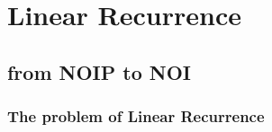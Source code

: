 \documentclass{beamer}
\begin{document}
\section{Linear Recurrence}
\subsection{from NOIP to NOI}

\begin{frame}
  \frametitle{The problem of Linear Recurrence}
\end{frame}
\end{document}
